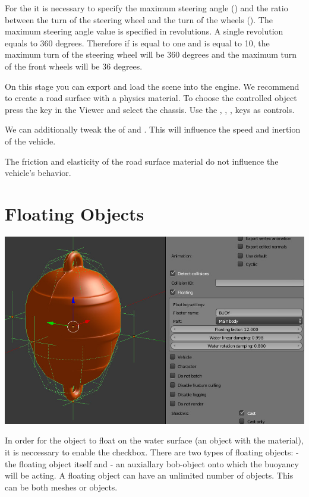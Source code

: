 \documentclass[a4paper,12pt,oneside]{sphinxmanual}
\begin{document}
For the  it is necessary to specify the maximum steering angle () and the ratio between the turn of the steering wheel and the turn of the wheels  (). The maximum steering angle value is specified in revolutions. A single revolution equals to 360 degrees. Therefore if  is equal to one and  is equal to 10, the maximum turn of the steering wheel will be 360 degrees and the maximum turn of the front wheels will be 36 degrees.

On this stage you can export and load the scene into the engine. We recommend to create a road surface with a physics material. To choose the controlled object press the  key in the Viewer and select the chassis. Use the , , ,  keys as controls.

We can additionally tweak the  of  and . This will influence the speed and inertion of the vehicle.

The friction and elasticity of the road surface material do not influence the vehicle's behavior.


\section{Floating Objects}
\label{physics:id7}
\includegraphics[width=1.000\linewidth]{physics_floater.jpg}

\begin{DUlineblock}{0em}
\item[] 
\end{DUlineblock}

In order for the object to float on the water surface (an object with the  material), it is neccessary to enable the  checkbox. There are two types of floating objects:  - the floating object itself and  - an auxiallary bob-object onto which the buoyancy will be acting. A floating object can have an unlimited number of  objects. This can be both meshes or  objects.
\end{document}
